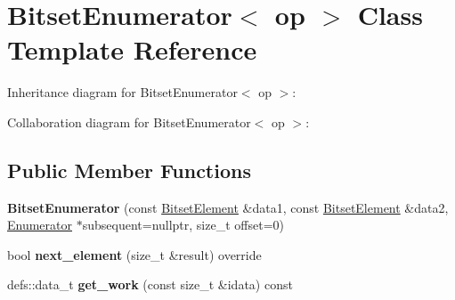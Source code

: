 \hypertarget{classBitsetEnumerator}{}\section{Bitset\+Enumerator$<$ op $>$ Class Template Reference}
\label{classBitsetEnumerator}


Inheritance diagram for Bitset\+Enumerator$<$ op $>$\+:


Collaboration diagram for Bitset\+Enumerator$<$ op $>$\+:
\subsection*{Public Member Functions}
\begin{DoxyCompactItemize}
\item 
{\bfseries Bitset\+Enumerator} (const \hyperlink{classBitsetElement}{Bitset\+Element} \&data1, const \hyperlink{classBitsetElement}{Bitset\+Element} \&data2, \hyperlink{classEnumerator}{Enumerator} $\ast$subsequent=nullptr, size\+\_\+t offset=0)\hypertarget{classBitsetEnumerator_a4c5297e92189eb2db688d5ae95aa074c}{}\label{classBitsetEnumerator_a4c5297e92189eb2db688d5ae95aa074c}

\item 
bool {\bfseries next\+\_\+element} (size\+\_\+t \&result) override\hypertarget{classBitsetEnumerator_a4b39060663550c127c5aa238865c94c4}{}\label{classBitsetEnumerator_a4b39060663550c127c5aa238865c94c4}

\item 
defs\+::data\+\_\+t {\bfseries get\+\_\+work} (const size\+\_\+t \&idata) const \hypertarget{classBitsetEnumerator_a940e791dcd9aaccdcaf5d29253a39016}{}\label{classBitsetEnumerator_a940e791dcd9aaccdcaf5d29253a39016}

\end{DoxyCompactItemize}
